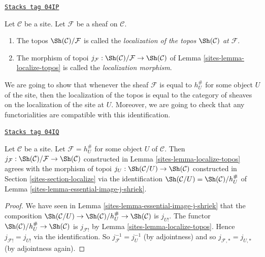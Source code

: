 \begin{definition}
\label{sites-definition-localize-topos}
\href{https://stacks.math.columbia.edu/tag/04IP}{\texttt{Stacks tag 04IP}}

Let $\mathcal{C}$ be a site.
Let $\mathcal{F}$ be a sheaf on $\mathcal{C}$.
\begin{enumerate}
\item The topos $\Sh(\mathcal{C})/\mathcal{F}$
is called the
{\it localization of the topos $\Sh(\mathcal{C})$ at $\mathcal{F}$}.
\item The morphism of topoi
$j_\mathcal{F} :
\Sh(\mathcal{C})/\mathcal{F}
\to
\Sh(\mathcal{C})$ of
Lemma \ref{sites-lemma-localize-topos}
is called the {\it localization morphism}.
\end{enumerate}
\end{definition}

We are going to show that whenever the sheaf $\mathcal{F}$ is equal to
$h_U^\#$ for some object $U$ of the site, then the localization of the
topos is equal to the category of sheaves on the localization of the site
at $U$. Moreover, we are going to check that any functorialities are
compatible with this identification.

\begin{lemma}
\label{sites-lemma-localize-compare}
\href{https://stacks.math.columbia.edu/tag/04IQ}{\texttt{Stacks tag 04IQ}}

Let $\mathcal{C}$ be a site. Let $\mathcal{F} = h_U^\#$ for some object $U$
of $\mathcal{C}$. Then $j_\mathcal{F} : \Sh(\mathcal{C})/\mathcal{F}
\to \Sh(\mathcal{C})$ constructed in
Lemma \ref{sites-lemma-localize-topos}
agrees with the morphism of topoi
$j_U : \Sh(\mathcal{C}/U) \to \Sh(\mathcal{C})$
constructed in
Section \ref{sites-section-localize}
via the identification
$\Sh(\mathcal{C}/U) = \Sh(\mathcal{C})/h_U^\#$
of
Lemma \ref{sites-lemma-essential-image-j-shriek}.
\end{lemma}

\begin{proof}

We have seen in
Lemma \ref{sites-lemma-essential-image-j-shriek}
that the composition
$\Sh(\mathcal{C}/U) \to \Sh(\mathcal{C})/h_U^\#
\to \Sh(\mathcal{C})$
is $j_{U!}$. The functor
$\Sh(\mathcal{C})/h_U^\# \to \Sh(\mathcal{C})$
is $j_{\mathcal{F}!}$ by
Lemma \ref{sites-lemma-localize-topos}.
Hence $j_{\mathcal{F}!} = j_{U!}$ via the identification.
So $j_\mathcal{F}^{-1} = j_U^{-1}$ (by adjointness) and so
$j_{\mathcal{F}, *} = j_{U, *}$ (by adjointness again).
\end{proof}

